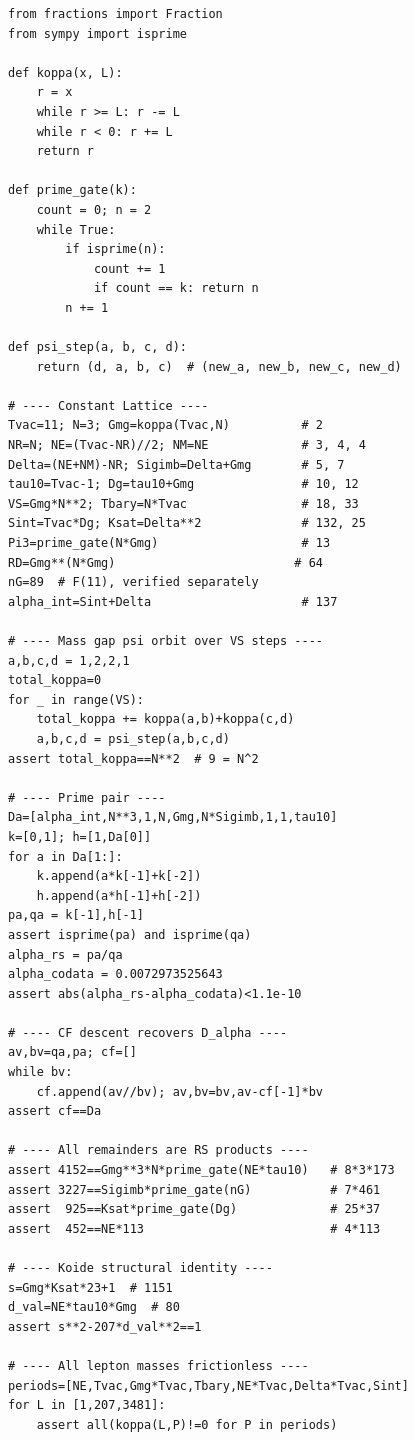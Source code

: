 \documentclass[11pt,letterpaper]{article}
\theoremstyle{plain}
\theoremstyle{definition}
\theoremstyle{remark}
\begin{document}
\begin{lstlisting}
from fractions import Fraction
from sympy import isprime

def koppa(x, L):
    r = x
    while r >= L: r -= L
    while r < 0: r += L
    return r

def prime_gate(k):
    count = 0; n = 2
    while True:
        if isprime(n):
            count += 1
            if count == k: return n
        n += 1

def psi_step(a, b, c, d):
    return (d, a, b, c)  # (new_a, new_b, new_c, new_d)

# ---- Constant Lattice ----
Tvac=11; N=3; Gmg=koppa(Tvac,N)          # 2
NR=N; NE=(Tvac-NR)//2; NM=NE             # 3, 4, 4
Delta=(NE+NM)-NR; Sigimb=Delta+Gmg       # 5, 7
tau10=Tvac-1; Dg=tau10+Gmg               # 10, 12
VS=Gmg*N**2; Tbary=N*Tvac                # 18, 33
Sint=Tvac*Dg; Ksat=Delta**2              # 132, 25
Pi3=prime_gate(N*Gmg)                    # 13
RD=Gmg**(N*Gmg)                         # 64
nG=89  # F(11), verified separately
alpha_int=Sint+Delta                     # 137

# ---- Mass gap psi orbit over VS steps ----
a,b,c,d = 1,2,2,1
total_koppa=0
for _ in range(VS):
    total_koppa += koppa(a,b)+koppa(c,d)
    a,b,c,d = psi_step(a,b,c,d)
assert total_koppa==N**2  # 9 = N^2

# ---- Prime pair ----
Da=[alpha_int,N**3,1,N,Gmg,N*Sigimb,1,1,tau10]
k=[0,1]; h=[1,Da[0]]
for a in Da[1:]:
    k.append(a*k[-1]+k[-2])
    h.append(a*h[-1]+h[-2])
pa,qa = k[-1],h[-1]
assert isprime(pa) and isprime(qa)
alpha_rs = pa/qa
alpha_codata = 0.0072973525643
assert abs(alpha_rs-alpha_codata)<1.1e-10

# ---- CF descent recovers D_alpha ----
av,bv=qa,pa; cf=[]
while bv:
    cf.append(av//bv); av,bv=bv,av-cf[-1]*bv
assert cf==Da

# ---- All remainders are RS products ----
assert 4152==Gmg**3*N*prime_gate(NE*tau10)   # 8*3*173
assert 3227==Sigimb*prime_gate(nG)           # 7*461
assert  925==Ksat*prime_gate(Dg)             # 25*37
assert  452==NE*113                          # 4*113

# ---- Koide structural identity ----
s=Gmg*Ksat*23+1  # 1151
d_val=NE*tau10*Gmg  # 80
assert s**2-207*d_val**2==1

# ---- All lepton masses frictionless ----
periods=[NE,Tvac,Gmg*Tvac,Tbary,NE*Tvac,Delta*Tvac,Sint]
for L in [1,207,3481]:
    assert all(koppa(L,P)!=0 for P in periods)
\end{lstlisting}
\end{document}
